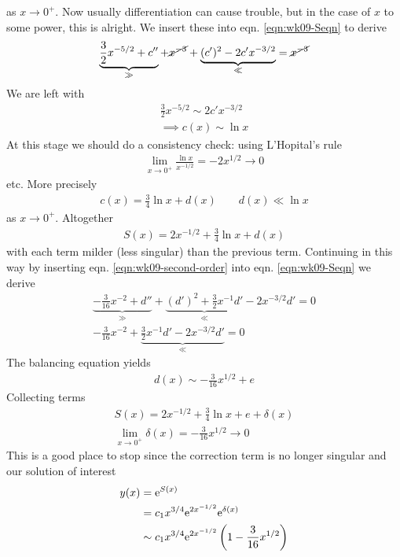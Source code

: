 as $x \rightarrow 0^{+}$. Now usually differentiation can cause trouble, but in the case of $x$ to some power, this is alright. We insert these into eqn. \ref{eqn:wk09-Seqn} to derive
\begin{align*}
	\underbrace{\frac{3}{2}x^{-5/2} + c''}_{\gg} + \cancel{x^{-3}} + \underbrace{(c')^2 - 2c'x^{-3/2}}_{\ll} = \cancel{x^{-3}}
\end{align*}
We are left with
\begin{gather*}
	\frac{3}{2}x^{-5/2} \sim 2c'x^{-3/2} \\
	\implies c(x) \sim \ln x
\end{gather*}
At this stage we should do a consistency check: using L'Hopital's rule
\begin{align*}
	\lim\limits_{x\rightarrow 0^+} \frac{\ln x}{x^{-1/2}} = -2x^{1/2} \rightarrow 0
\end{align*}
etc. More precisely
\begin{align*}
	c(x) = \frac{3}{4} \ln x + d(x) \qquad d(x) \ll \ln x
\end{align*}
as $x \rightarrow 0^+$. Altogether
\begin{align}\label{eqn:wk09-second-order}
	S(x) = 2x^{-1/2} + \frac{3}{4}\ln x + d(x)
\end{align}
with each term milder (less singular) than the previous term. Continuing in this way by inserting eqn. \ref{eqn:wk09-second-order} into eqn. \ref{eqn:wk09-Seqn} we derive
\begin{gather*}
	\underbrace{-\frac{3}{16}x^{-2} + d''}_\gg + \underbrace{(d')^2 + \frac{3}{2}x^{-1} d'}_\ll  - 2x^{-3/2}d' = 0 \\
	-\frac{3}{16} x^{-2} + \underbrace{\frac{3}{2}x^{-1}d' - 2 x^{-3/2} d'}_\ll  = 0
\end{gather*}
The balancing equation yields
\begin{gather*}
	d(x) \sim -\frac{3}{16}x^{1/2} + e
\end{gather*}
Collecting terms
\begin{gather*}
	S(x) = 2x^{-1/2} + \frac{3}{4}\ln x + e + \delta(x) \\
	\lim\limits_{x \rightarrow 0^+}\delta(x) = - \frac{3}{16}x^{1/2} \rightarrow 0
\end{gather*}
This is a good place to stop since the correction term is no longer singular and our solution of interest
\begin{align*}
	y(x) &= \mathrm{e}^{S(x)} \\
		&=  c_1 x^{3/4} \mathrm{e}^{2x^{-1/2}}  \mathrm{e}^{\delta(x)} \\
		&\sim c_1 x^{3/4} \mathrm{e}^{2x^{-1/2}} \left(1 - \frac{3}{16}x^{1/2}\right)
\end{align*} 
